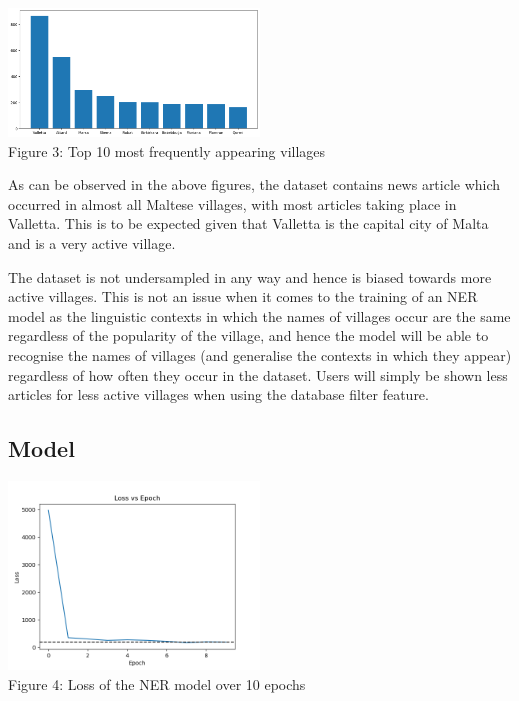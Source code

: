 \documentclass[a4paper, oneside, 11pt]{article}
\begin{document}
\begin{multicols*}{2}
  \begin{center}
    \includegraphics[width=0.5\textwidth]{./figures/villagefreqtop10.png} \\
    Figure 3: Top 10 most frequently appearing villages
  \end{center}

  As can be observed in the above figures, the dataset contains news article which occurred in almost all Maltese villages, with most articles taking place in Valletta. This is to be expected given that Valletta is the capital city of Malta and is a very active village.

  The dataset is not undersampled in any way and hence is biased towards more active villages. This is not an issue when it comes to the training of an NER model as the linguistic contexts in which the names of villages occur are the same regardless of the popularity of the village, and hence the model will be able to recognise the names of villages (and generalise the contexts in which they appear) regardless of how often they occur in the dataset. Users will simply be shown less articles for less active villages when using the database filter feature.





  \subsection{Model}
  \begin{center}
    \includegraphics[width=0.5\textwidth]{./figures/nerloss.png} \\
    Figure 4: Loss of the NER model over 10 epochs
  \end{center}


\end{multicols*}
\end{document}
